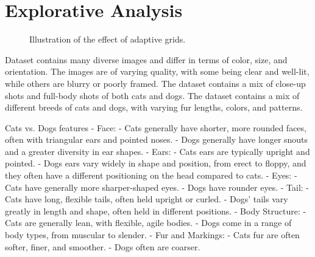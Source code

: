 \section{Explorative Analysis}
\begin{figure}[H]
    \vspace*{-0.7cm}
    \centering
    \hspace{1cm}
    \caption{Illustration of the effect of adaptive grids.}
    \label{fig:cats_dogs}
    \vspace*{-0.7cm}
\end{figure}

Dataset contains many diverse images and differ in terms of color, size, and orientation. The images are of varying quality, with some being clear and well-lit, while others are blurry or poorly framed. The dataset contains a mix of close-up shots and full-body shots of both cats and dogs. The dataset contains a mix of different breeds of cats and dogs, with varying fur lengths, colors, and patterns.

Cats vs. Dogs features
- Face:
- Cats generally have shorter, more rounded faces, often with triangular ears and pointed noses.
- Dogs generally have longer snouts and a greater diversity in ear shapes.
- Ears:
- Cats ears are typically upright and pointed.
- Dogs ears vary widely in shape and position, from erect to floppy, and they often have a different positioning on the head compared to cats.
- Eyes:
- Cats have generally more sharper-shaped eyes.
- Dogs have rounder eyes.
- Tail:
- Cats have long, flexible tails, often held upright or curled.
- Dogs’ tails vary greatly in length and shape, often held in different positions.
- Body Structure:
- Cats are generally lean, with flexible, agile bodies.
- Dogs come in a range of body types, from muscular to slender.
- Fur and Markings:
- Cats fur are often softer, finer, and smoother.
- Dogs often are coarser.